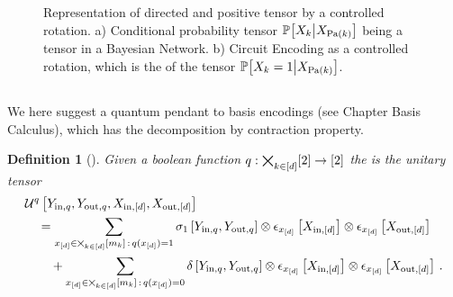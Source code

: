 \documentclass[aps,onecolumn,nofootinbib,pra]{article}
\newtheorem{definition}{Definition}
\begin{document}
    \begin{figure}
        \begin{center}
            
        \end{center}
        \caption{
            Representation of directed and positive tensor by a controlled rotation.
            a) Conditional probability tensor $\mathbb{P}\big[X_{k}\big|X_{\mathrm{Pa}(k)}\big]$ being a tensor in a Bayesian Network.
            b) Circuit Encoding as a controlled rotation, which is the \ActivationCircuit{} of the tensor $\mathbb{P}\big[X_{k}=1\big|X_{\mathrm{Pa}(k)}\big]$.
        }
    \end{figure}

    \subsection{\ComputationCircuits{}}

    We here suggest a quantum pendant to basis encodings (see Chapter Basis Calculus), which has the decomposition by contraction property.

    \begin{definition}[\ComputationCircuit{}]
        Given a boolean function $q:\bigtimes_{k\in[d]}[2]\rightarrow[2]$ the \computationCircuit{} is the unitary tensor
        \begin{align*}
            &\mathcal{U}^{q}\left[Y_{\mathrm{in},q},Y_{\mathrm{out},q},X_{\mathrm{in},[d]},X_{\mathrm{out},[d]}\right] \\
            &\quad=
            \sum_{x_{[d]}\in\bigtimes_{k\in[d]}[m_{k}]\,:\,q(x_{[d]})=1}
            \sigma_1\left[Y_{\mathrm{in},q},Y_{\mathrm{out},q}\right] \otimes
            \epsilon_{x_{[d]}}\left[X_{\mathrm{in},[d]}\right] \otimes \epsilon_{x_{[d]}}\left[X_{\mathrm{out},[d]}\right] \\
            & \quad \quad +
            \sum_{x_{[d]}\in\bigtimes_{k\in[d]}[m_{k}]\,:\,q(x_{[d]})=0}
            \delta\left[Y_{\mathrm{in},q},Y_{\mathrm{out},q}\right] \otimes
            \epsilon_{x_{[d]}}\left[X_{\mathrm{in},[d]}\right] \otimes \epsilon_{x_{[d]}}\left[X_{\mathrm{out},[d]}\right] \, .
        \end{align*}
    \end{definition}
\end{document}
